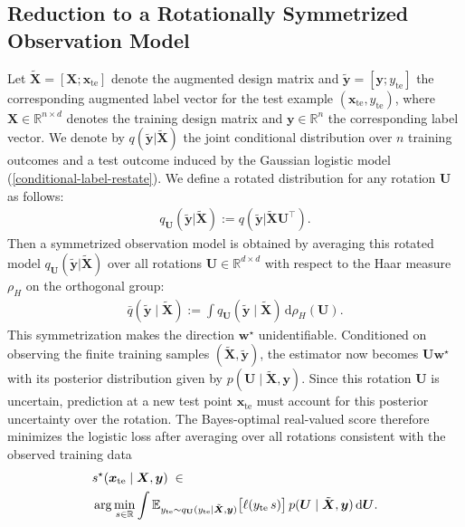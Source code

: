 \documentclass{article}
\theoremstyle{plain}
\theoremstyle{definition}
\theoremstyle{remark}
\begin{document}
\subsection{Reduction to a Rotationally Symmetrized Observation Model}
Let $\tilde{\boldsymbol X} = [\boldsymbol X;\boldsymbol x_{\mathrm{te}}]$ denote the
augmented design matrix and
$\tilde{\boldsymbol y} = [\boldsymbol y; y_{\mathrm{te}}]$ the corresponding augmented
label vector for the test example $(\boldsymbol x_{\mathrm{te}}, y_{\mathrm{te}})$,
where $\boldsymbol X \in \mathbb{R}^{n \times d}$ denotes the training design matrix and
$\boldsymbol y \in \mathbb{R}^{n}$ the corresponding label vector.
We denote by $q(\tilde{\boldsymbol y} | \tilde{\boldsymbol X})$ the joint conditional distribution over $n$ training outcomes and a test outcome induced by the Gaussian logistic model~%
(\ref{conditional-label-restate}). We define a rotated distribution for any rotation $\boldsymbol U$ as follows:
\begin{align}
    q_{\boldsymbol{U}}(\tilde{\boldsymbol y} | \tilde{\boldsymbol X}):=q(\tilde{\boldsymbol y}| \tilde{\boldsymbol X}\boldsymbol U^\top).
\end{align}
Then a symmetrized observation model is obtained by averaging this rotated model $q_{\boldsymbol{U}}(\tilde{\boldsymbol y}| \tilde{\boldsymbol X})$ over all rotations $\boldsymbol U\in\mathbb R^{d\times d}$ with respect to the Haar measure
$\rho_H$ on the orthogonal group:
\begin{align}
\label{symmetrized-model}
\bar q(\tilde{\boldsymbol y}\mid \tilde{\boldsymbol X})
:=
\int
q_{\boldsymbol{U}}(\tilde{\boldsymbol y} \mid \tilde{\boldsymbol X})\,
\mathrm d\rho_H(\boldsymbol U).
\end{align}
This symmetrization makes the direction $\mathbf{w}^\star$ unidentifiable. Conditioned on observing the finite training samples $(\tilde{\boldsymbol X}, \tilde{\boldsymbol y})$, the estimator now becomes $\boldsymbol{U}\mathbf{w}^\star$ with its posterior distribution given by $p(\boldsymbol U\mid \tilde{\boldsymbol X},\boldsymbol y)$. Since this rotation $\boldsymbol{U}$ is uncertain, prediction at a new test point $\boldsymbol{x}_{\mathrm{te}}$ must account for this posterior uncertainty over the rotation. The Bayes-optimal real-valued score therefore minimizes the logistic loss after averaging over all rotations consistent with the observed training data
\begin{align*}
& s^\star(\boldsymbol x_{\mathrm{te}}\mid \boldsymbol X,\boldsymbol y)
\;\in\; \notag \\
& \arg\min_{s\in\mathbb R}
\int
\mathbb E_{y_{\mathrm{te}}\sim q_{\mathbf{U}}(y_{\mathrm{te}} \mid \tilde{\boldsymbol X}, \boldsymbol y)}
\big[\ell(y_{\mathrm{te}}\, s)\big]\,
p(\boldsymbol U\mid \tilde{\boldsymbol X},\boldsymbol y)\,
\mathrm d\boldsymbol U .
\end{align*}
\end{document}
